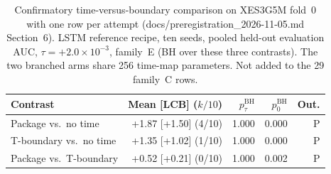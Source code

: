 \begin{table}[tbp]
\caption{Confirmatory time-versus-boundary comparison on XES3G5M fold~0
with one row per attempt (docs/preregistration\_2026-11-05.md
Section~6). LSTM reference recipe, ten seeds, pooled held-out
evaluation AUC, $\tau{=}{+}2.0\times 10^{-3}$, family~E (BH over these
three contrasts). The two branched arms share 256 time-map parameters.
Not added to the 29 family~C rows.}
\label{tab:attempt-threeway}
\centering
\footnotesize
\begin{tabular}{@{}lrrrr@{}}
\toprule
Contrast & Mean [LCB] ($k/10$) & $p_{\tau}^{\mathrm{BH}}$ & $p_{0}^{\mathrm{BH}}$ & Out. \\
\midrule
Package vs.\ no time & +1.87 [+1.50] (4/10) & 1.000 & 0.000 & P \\
T-boundary vs.\ no time & +1.35 [+1.02] (1/10) & 1.000 & 0.000 & P \\
Package vs.\ T-boundary & +0.52 [+0.21] (0/10) & 1.000 & 0.002 & P \\
\bottomrule
\end{tabular}
\end{table}
